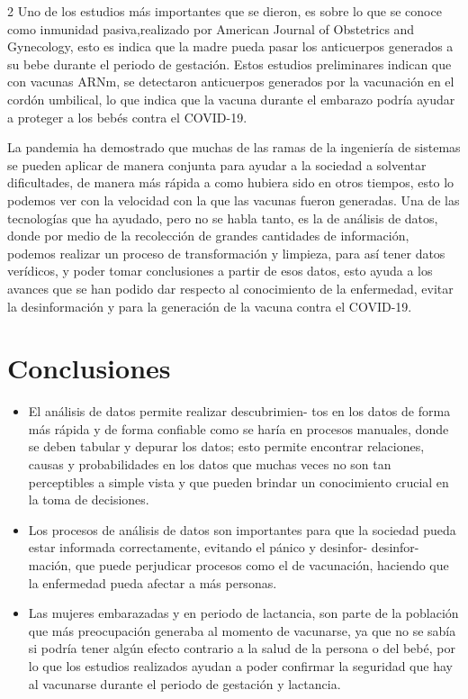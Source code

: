 \documentclass[12pt,spanish,Letterpaper,openany]{book}
\begin{document}
\begin {multicols}{2}
Uno de los estudios más importantes que se dieron, es sobre lo que se conoce como inmunidad pasiva,realizado por
American Journal of Obstetrics and Gynecology, esto es indica que la madre pueda pasar los anticuerpos generados
a su bebe durante el periodo de gestación. Estos estudios preliminares indican que con vacunas ARNm, se detectaron
anticuerpos generados por la vacunación en el cordón umbilical, lo que indica que la vacuna durante el embarazo
podría ayudar a proteger a los bebés contra el COVID-19.

La pandemia ha demostrado que muchas de las ramas de la ingeniería de sistemas se pueden aplicar de manera
conjunta para ayudar a la sociedad a solventar dificultades, de manera más rápida a como hubiera sido en otros
tiempos, esto lo podemos ver con la velocidad con la que las vacunas fueron generadas. Una de las tecnologías que
ha ayudado, pero no se habla tanto, es la de análisis de datos, donde por medio de la recolección de grandes cantidades
de información, podemos realizar un proceso de transformación y limpieza, para así tener datos verídicos, y poder
tomar conclusiones a partir de esos datos, esto ayuda a los avances que se han podido dar respecto al conocimiento
de la enfermedad, evitar la desinformación y para la generación de la vacuna contra el COVID-19.

\hypertarget{conclusiones-5}{%
\section{Conclusiones}\label{conclusiones-5}}

\begin{itemize}
\item
  El análisis de datos permite realizar descubrimien-
  tos en los datos de forma más rápida y de forma confiable como se
  haría en procesos manuales, donde se deben tabular y depurar los datos; esto permite encontrar relaciones, causas y
  probabilidades en los datos que muchas veces no son tan perceptibles a simple vista y que pueden brindar un
  conocimiento crucial en la toma de decisiones.
\item
  Los procesos de análisis de datos son importantes para que la sociedad pueda estar informada correctamente, evitando
  el pánico y desinfor- desinfor-
  mación, que puede perjudicar procesos como el de vacunación, haciendo que la enfermedad
  pueda afectar a más personas.
\item
  Las mujeres embarazadas y en periodo de lactancia, son parte de la población que más preocupación generaba al
  momento de vacunarse, ya que no se sabía si podría tener algún efecto contrario a la salud de la persona o del bebé,
  por lo que los estudios realizados ayudan a poder confirmar la seguridad que hay al vacunarse durante el periodo de
  gestación y lactancia.
\end{itemize}


\end{multicols}
\end{document}
